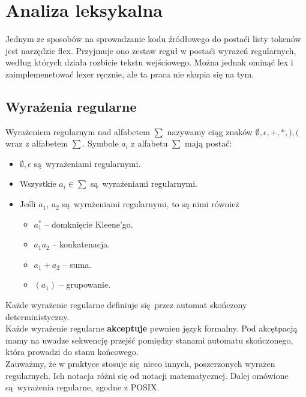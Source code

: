 \section{Analiza leksykalna}

	Jednym ze sposobów na sprowadzanie kodu źródłowego do postaći listy tokenów jest narzędzie flex.
	Przyjmuje ono zestaw reguł w postaći wyrażeń regularnych, według których
	działa rozbicie tekstu wejściowego. Można jednak ominąć lex i zaimplemenetować lexer ręcznie, ale
	ta praca nie skupia się na tym.

	\subsection{Wyrażenia regularne}

		Wyrażeniem regularnym nad alfabetem $\sum$ nazywamy ciąg znaków
		$\emptyset, \epsilon, +, *, ), ($ wraz z alfabetem $\sum$. Symbole $a_i$ z alfabetu $\sum$ mają
		postać:
		
		\begin{itemize}
		    \item $\emptyset, \epsilon$ są wyrażeniami regularnymi.
		    \item Wszystkie $a_i \in \sum$ są wyrażeniami regularnymi.
		    \item Jeśli $a_1$, $a_2$ są wyrażeniami regularnymi, to są nimi również
		    \begin{itemize}
		        \item $a_1^*$ -- domknięcie Kleene'go.
		        \item $a_1a_2$ -- konkatenacja.
		        \item $a_1 + a_2$ -- suma.
		        \item $(a_1)$ -- grupowanie.
		    \end{itemize}
		\end{itemize}
		
		Każde wyrażenie regularne definiuje się przez automat skończony deterministyczny. \\
		Każde wyrażenie regularne \textbf{akceptuje} pewnien język formalny. Pod akcętpacją
		mamy na uwadze sekwencję przejść pomiędzy stanami automatu skończonego, która prowadzi
		do stanu końcowego. \\
		
		Zauważmy, że w praktyce stosuje się nieco innych, poszerzonych wyrażen regularnych. Ich notacja różni się
		od notacji matematycznej. Dalej omówione są wyrażenia regularne, zgodne z POSIX. \\

